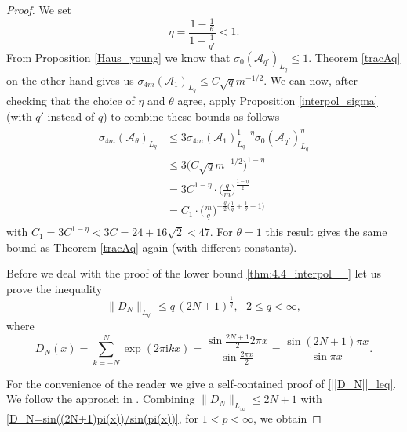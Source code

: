 \documentclass[11pt,reqno]{article}
\numberwithin{equation}{section}
\theoremstyle{definition}
\theoremstyle{plain}
\newcommand{\ca}{\ensuremath{\mathcal A}}
\begin{document}
\begin{proof}
 We set
    \begin{equation}
        \eta = \frac{1- \frac{1}{\theta}}{1-\frac{1}{q'}} < 1.
    \end{equation}
    From Proposition \ref{Haus_young} we know that \(\sigma_0(\ca_{q'})_{L_q} \leq 1\). Theorem \ref{tracAq} on the other hand gives us \(\sigma_{4m}(\ca_1)_{L_q} \leq C \sqrt{q} m^{-1/2}\). We can now, after checking that the choice of \(\eta\) and \(\theta\) agree, apply Proposition \ref{interpol_sigma} (with \(q'\) instead of \(q\)) to combine these bounds as follows
    \begin{align}
        \begin{split}
             \sigma_{4m}(\ca_\theta)_{L_{q}} & \leq 3 \sigma_{4m}(\ca_1)_{L_{q}}^{1-\eta} \sigma_0(\ca_{q'})_{L_{q}}^\eta \\
             & \leq 3\big(C \sqrt{q} m^{-1/2}\big)^{1-\eta} \\
             &= 3C^{1-\eta} \cdot \Big(\frac{q}{m}\Big)^{\frac{1-\eta}{2}} \\
             & = C_1 \cdot \Big(\frac{m}{q}\Big)^{ -\frac{q}{2}\big(\frac{1}{q}+\frac{1}{\theta}-1\big)} 
        \end{split}
    \end{align}
with \(C_1 = 3C^{1-\eta} < 3C =24 + 16 \sqrt{2} <  47\).
For \(\theta =1\) this result gives the same bound as Theorem \ref{tracAq} again (with different constants).  


Before we deal with the proof of the lower bound \eqref{thm:4.4_interpol__} let us prove the inequality
 \begin{equation} 
 \label{||D_N||_leq}
\|D_N\|_{L_{q'}} 
  \leq q \, (2N+1)^{\frac{1}{q}} , \ \ \ 2 \leq q < \infty ,
 \end{equation}
where 
 \begin{equation} 
 \label{D_N=sin((2N+1)pi(x))/sin(pi(x))}
D_N(x) = \sum\limits_{k=-N}^{N} \exp(2\pi \mathrm{i} kx) = \frac{\sin\frac{2N+1}{2}2\pi x}{\sin\frac{2\pi x}{2}} 
= \frac{\sin (2N+1) \pi x}{\sin \pi x } .
 \end{equation}

 For the convenience of the reader we give a self-contained proof of \eqref{||D_N||_leq}. We follow the approach in \cite{Ul_1968}.
 Combining $\|D_N\|_{L_{\infty}}\leq 2N+1$ with \eqref{D_N=sin((2N+1)pi(x))/sin(pi(x))}, for $1 < p < \infty$, we obtain


\end{proof}
\end{document}
